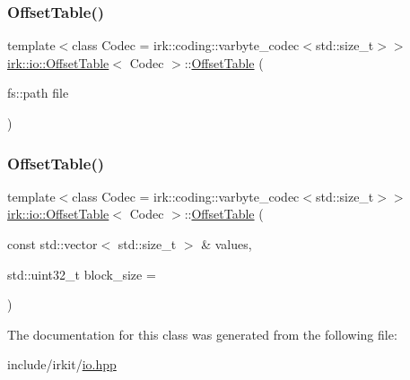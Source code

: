 \subsubsection{\texorpdfstring{Offset\+Table()}{OffsetTable()}\hspace{0.1cm}{\footnotesize\ttfamily [1/2]}}
{\footnotesize\ttfamily template$<$class Codec = irk\+::coding\+::varbyte\+\_\+codec$<$std\+::size\+\_\+t$>$$>$ \\
\mbox{\hyperlink{classirk_1_1io_1_1OffsetTable}{irk\+::io\+::\+Offset\+Table}}$<$ Codec $>$\+::\mbox{\hyperlink{classirk_1_1io_1_1OffsetTable}{Offset\+Table}} (\begin{DoxyParamCaption}\item[{fs\+::path}]{file }\end{DoxyParamCaption})\hspace{0.3cm}{\ttfamily [inline]}}

\mbox{\label{classirk_1_1io_1_1OffsetTable_a8aa12e4d3b60eb83f2979731b4d2c107}} 
\subsubsection{\texorpdfstring{Offset\+Table()}{OffsetTable()}\hspace{0.1cm}{\footnotesize\ttfamily [2/2]}}
{\footnotesize\ttfamily template$<$class Codec = irk\+::coding\+::varbyte\+\_\+codec$<$std\+::size\+\_\+t$>$$>$ \\
\mbox{\hyperlink{classirk_1_1io_1_1OffsetTable}{irk\+::io\+::\+Offset\+Table}}$<$ Codec $>$\+::\mbox{\hyperlink{classirk_1_1io_1_1OffsetTable}{Offset\+Table}} (\begin{DoxyParamCaption}\item[{const std\+::vector$<$ std\+::size\+\_\+t $>$ \&}]{values,  }\item[{std\+::uint32\+\_\+t}]{block\+\_\+size = {} }\end{DoxyParamCaption})\hspace{0.3cm}{\ttfamily [inline]}}



The documentation for this class was generated from the following file\+:\begin{DoxyCompactItemize}
\item 
include/irkit/\mbox{\hyperlink{io_8hpp}{io.\+hpp}}\end{DoxyCompactItemize}
